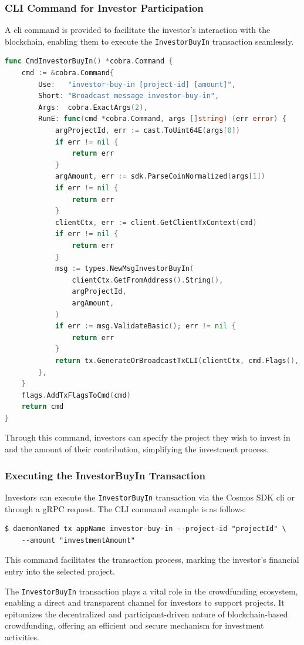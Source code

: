 \subsubsection{CLI Command for Investor Participation}

A \gls{cli} command is provided to facilitate the investor's interaction with the blockchain, enabling them to execute the \texttt{InvestorBuyIn} transaction seamlessly.

\begin{lstlisting}[language=go, caption=Investor Buy-in CLI Definition, label={lst:investor-buyin-cli}]
func CmdInvestorBuyIn() *cobra.Command {
	cmd := &cobra.Command{
		Use:   "investor-buy-in [project-id] [amount]",
		Short: "Broadcast message investor-buy-in",
		Args:  cobra.ExactArgs(2),
		RunE: func(cmd *cobra.Command, args []string) (err error) {
			argProjectId, err := cast.ToUint64E(args[0])
			if err != nil {
				return err
			}
			argAmount, err := sdk.ParseCoinNormalized(args[1])
			if err != nil {
				return err
			}
			clientCtx, err := client.GetClientTxContext(cmd)
			if err != nil {
				return err
			}
			msg := types.NewMsgInvestorBuyIn(
				clientCtx.GetFromAddress().String(),
				argProjectId,
				argAmount,
			)
			if err := msg.ValidateBasic(); err != nil {
				return err
			}
			return tx.GenerateOrBroadcastTxCLI(clientCtx, cmd.Flags(), msg)
		},
	}
	flags.AddTxFlagsToCmd(cmd)
	return cmd
}
\end{lstlisting}

Through this command, investors can specify the project they wish to invest in and the amount of their contribution, simplifying the investment process.

\subsubsection{Executing the InvestorBuyIn Transaction}

Investors can execute the \texttt{InvestorBuyIn} transaction via the Cosmos SDK \gls{cli} or through a gRPC request. The CLI command example is as follows:

\begin{verbatim}
$ daemonNamed tx appName investor-buy-in --project-id "projectId" \
    --amount "investmentAmount"
\end{verbatim}

This command facilitates the transaction process, marking the investor's financial entry into the selected project.

The \texttt{InvestorBuyIn} transaction plays a vital role in the crowdfunding ecosystem, enabling a direct and transparent channel for investors to support projects. It epitomizes the decentralized and participant-driven nature of blockchain-based crowdfunding, offering an efficient and secure mechanism for investment activities.

